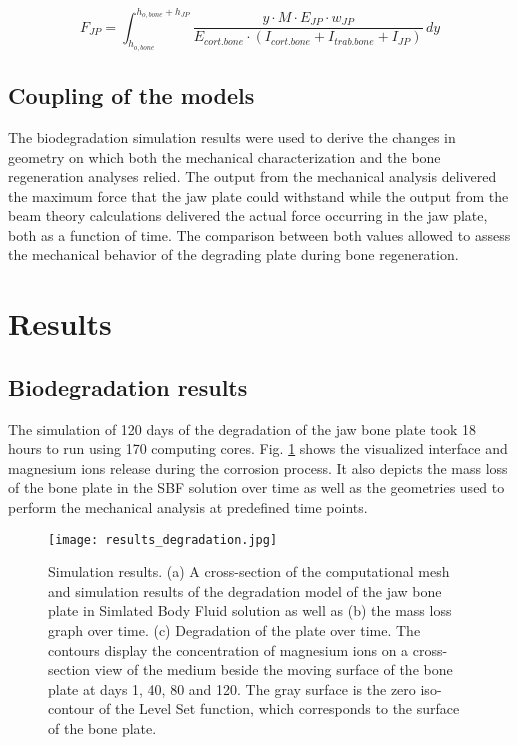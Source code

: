 \begin{equation}
F_{JP}=\int_{h_{o,bone}}^{h_{o,bone}+h_{JP}} \frac{y \cdot M \cdot E_{JP} \cdot w_{JP}}{E_{cort.bone} \cdot (I_{cort.bone}+I_{trab.bone}+I_{JP})}  \,dy
\label{eq:integral}
\end{equation}


\subsection{Coupling of the models}

The biodegradation simulation results were used to derive the changes in geometry on which both the mechanical characterization and the bone regeneration analyses relied. The output from the mechanical analysis delivered the maximum force that the jaw plate could withstand while the output from the beam theory calculations delivered the actual force occurring in the jaw plate, both as a function of time. The comparison between both values allowed to assess the mechanical behavior of the degrading plate during bone regeneration.


\section{Results}
\label{sec:results}

\subsection{Biodegradation results}

The simulation of 120 days of the degradation of the jaw bone plate took 18 hours to run using 170 computing cores. Fig. \ref{fig:results_degradation} shows the visualized interface and magnesium ions release during the corrosion process. It also depicts the mass loss of the bone plate in the \gls{SBF} solution over time as well as the geometries used to perform the mechanical analysis at predefined time points.

\begin{figure}[t]
\centering
\medskip
\texttt{[image: results\_degradation.jpg]}
\caption[Simulation results of the degradation model of the jaw bone plate]{Simulation results. (a) A cross-section of the computational mesh and simulation results of the degradation model of the jaw bone plate in Simlated Body Fluid solution as well as (b) the mass loss graph over time. (c) Degradation of the plate over time. The contours display the concentration of magnesium ions on a cross-section view of the medium beside the moving surface of the bone plate at days 1, 40, 80 and 120. The gray surface is the zero iso-contour of the Level Set function, which corresponds to the surface of the bone plate.} \label{fig:results_degradation}
\end{figure}

